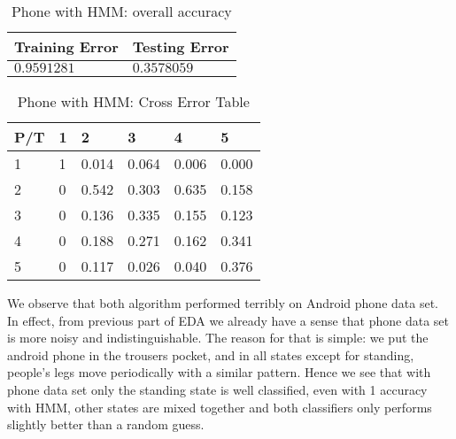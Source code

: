 \begin{itemize}
\begin{table}[H]
\begin{center}
\begin{tabular}{|l|l|}
      \hline
      Training Error & Testing Error\\
      \hline
      $0.9591281$ & $0.3578059$ \\
      \hline
\end{tabular}
\caption{Phone with HMM: overall accuracy}
\label{tab:phoneHMM1}
\end{center}
\end{table}
\begin{table}[H]
\begin{center}
\begin{tabular}{|l|l|l|l|l|l|}
      \hline
      P/T& 1 & 2 &3 & 4 & 5 \\
      \hline
      1 &1&0.014&0.064&0.006&0.000\\
      2 &0&0.542&0.303&0.635&0.158\\
      3 &0&0.136&0.335&0.155&0.123\\
      4 &0&0.188&0.271&0.162&0.341\\
      5 & 0&0.117&0.026&0.040&0.376\\
      \hline
\end{tabular}
\caption{Phone with HMM: Cross Error Table}
\label{tab:phoneHMM2}
\end{center}
\end{table}
\end{itemize}

We observe that both algorithm performed terribly on Android phone data set. In effect, from previous part of EDA we already have a sense that phone data set is more noisy and indistinguishable. The reason for that is simple: we put the android phone in the trousers pocket, and in all states except for standing, people's legs move periodically with a similar pattern. Hence we see that with phone data set only the standing state is well classified, even with 1 accuracy with HMM, other states are mixed together and both classifiers only performs slightly better than a random guess. 

